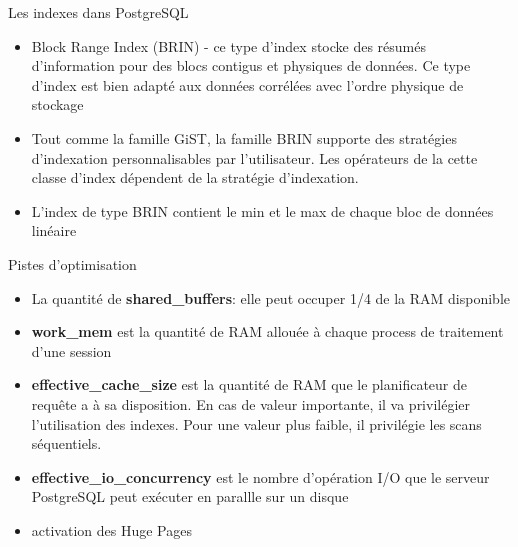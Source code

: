 
\begin{frame}[fragile]{Les indexes dans PostgreSQL}


   \begin{itemize}
      \item Block Range Index (BRIN) - ce type d'index stocke des résumés d'information pour des blocs contigus et physiques de données. Ce type d'index est bien adapté aux données corrélées avec l'ordre physique de stockage
      \item Tout comme la famille GiST, la famille BRIN supporte des stratégies d'indexation personnalisables par l'utilisateur. Les opérateurs de la cette classe d'index dépendent de la stratégie d'indexation.
      \item L'index de type BRIN contient le min et le max de chaque bloc de données linéaire
   \end{itemize}

\end{frame}


\begin{frame}[fragile]{Pistes d'optimisation}

   \begin{itemize}
      \item La quantité de \textbf{shared\_buffers}: elle peut occuper 1/4 de la RAM disponible
      \item \textbf{work\_mem} est la quantité de RAM allouée à chaque process de traitement d'une session
      \item \textbf{effective\_cache\_size} est la quantité de RAM que le planificateur de requête a à sa disposition. En cas de valeur importante, il va privilégier l'utilisation des indexes. Pour une valeur plus faible, il privilégie les scans séquentiels.
      \item \textbf{effective\_io\_concurrency} est le nombre d'opération I/O que le serveur PostgreSQL peut exécuter en parallle sur un disque
      \item activation des Huge Pages
   \end{itemize}

\begin{toile}
\end{toile}

\end{frame}

